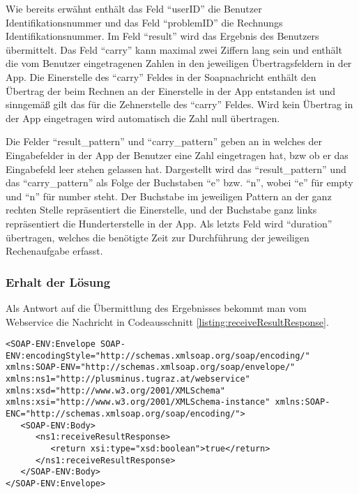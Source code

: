 Wie bereits erwähnt enthält das Feld \enquote{userID} die Benutzer Identifikationsnummer und das 
Feld \enquote{problemID} die Rechnungs Identifikationsnummer. Im Feld \enquote{result} wird das
Ergebnis des Benutzers übermittelt. Das Feld \enquote{carry} kann maximal zwei Ziffern lang sein 
und enthält die vom Benutzer eingetragenen Zahlen in den jeweiligen Übertragsfeldern in der App.
Die Einerstelle des \enquote{carry} Feldes in der Soapnachricht enthält den Übertrag der beim Rechnen 
an der Einerstelle in der App entstanden ist und sinngemäß gilt das für die Zehnerstelle des \enquote{carry}
Feldes. Wird kein Übertrag in der App eingetragen wird automatisch die Zahl null übertragen.

Die Felder \enquote{result\_pattern} und \enquote{carry\_pattern} geben an in welches der Eingabefelder
in der App der Benutzer eine Zahl eingetragen hat, bzw ob er das Eingabefeld leer stehen gelassen hat.
Dargestellt wird das \enquote{result\_pattern} und das \enquote{carry\_pattern} als Folge der Buchstaben
\enquote{e} bzw. \enquote{n}, wobei \enquote{e} für empty und \enquote{n} für number steht. Der Buchstabe
im jeweiligen Pattern an der ganz rechten Stelle repräsentiert die Einerstelle, und der Buchstabe ganz
links repräsentiert die Hunderterstelle in der App. Als letzts Feld wird \enquote{duration} übertragen, welches
die benötigte Zeit zur Durchführung der jeweiligen Rechenaufgabe erfasst.

\subsubsection{Erhalt der Lösung}
Als Antwort auf die Übermittlung des Ergebnisses bekommt man vom Webservice die Nachricht in Codeausschnitt
\ref{listing:receiveResultResponse}. 
\begin{lstlisting}[caption=Antwort auf Übermittlung des Ergebnisses, label=listing:receiveResultResponse]
<SOAP-ENV:Envelope SOAP-ENV:encodingStyle="http://schemas.xmlsoap.org/soap/encoding/" xmlns:SOAP-ENV="http://schemas.xmlsoap.org/soap/envelope/" xmlns:ns1="http://plusminus.tugraz.at/webservice" xmlns:xsd="http://www.w3.org/2001/XMLSchema" xmlns:xsi="http://www.w3.org/2001/XMLSchema-instance" xmlns:SOAP-ENC="http://schemas.xmlsoap.org/soap/encoding/">
   <SOAP-ENV:Body>
      <ns1:receiveResultResponse>
         <return xsi:type="xsd:boolean">true</return>
      </ns1:receiveResultResponse>
   </SOAP-ENV:Body>
</SOAP-ENV:Envelope>
\end{lstlisting}

